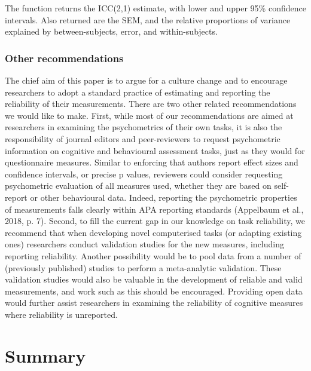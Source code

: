 \documentclass[english,,man,floatsintext]{apa6}
\begin{document}
The function returns the ICC(2,1) estimate, with lower and upper 95\% confidence intervals. Also returned are the SEM, and the relative proportions of variance explained by between-subjects, error, and within-subjects.

\hypertarget{other-recommendations}{%
\subsubsection{Other recommendations}\label{other-recommendations}}

The chief aim of this paper is to argue for a culture change and to encourage researchers to adopt a standard practice of estimating and reporting the reliability of their measurements. There are two other related recommendations we would like to make. First, while most of our recommendations are aimed at researchers in examining the psychometrics of their own tasks, it is also the responsibility of journal editors and peer-reviewers to request psychometric information on cognitive and behavioural assessment tasks, just as they would for questionnaire measures. Similar to enforcing that authors report effect sizes and confidence intervals, or precise p values, reviewers could consider requesting psychometric evaluation of all measures used, whether they are based on self-report or other behavioural data. Indeed, reporting the psychometric properties of measurements falls clearly within APA reporting standards (Appelbaum et al., 2018, p. 7). Second, to fill the current gap in our knowledge on task reliability, we recommend that when developing novel computerised tasks (or adapting existing ones) researchers conduct validation studies for the new measures, including reporting reliability. Another possibility would be to pool data from a number of (previously published) studies to perform a meta-analytic validation. These validation studies would also be valuable in the development of reliable and valid measurements, and work such as this should be encouraged. Providing open data would further assist researchers in examining the reliability of cognitive measures where reliability is unreported.

\hypertarget{summary}{%
\section{Summary}\label{summary}}
\end{document}

